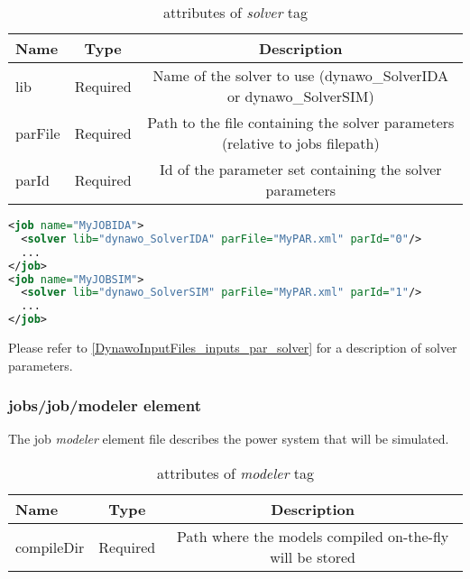 \documentclass[a4paper, 12pt]{report}
\begin{document}
\begin{table}[H]
\center
\begin{tabular}{ l | c | c }
\toprule
\textbf{{Name}} & \textbf{{Type}} & \textbf{{Description}}\\
\midrule
\rowcolor{white}
\small{lib} & \small{Required} & \small{Name of the solver to use (dynawo\_SolverIDA or dynawo\_SolverSIM)}\\
\rowcolor{gray!10}
\small{parFile} & \small{Required} & \small{Path to the file containing the solver parameters (relative to jobs filepath)}\\
\rowcolor{white}
\small{parId} & \small{Required} & \small{Id of the parameter set containing the solver parameters}\\
\bottomrule
\end{tabular}
\caption{attributes of \textit{solver} tag}
\end{table}

\begin{lstlisting}[language=XML, morekeywords={lib}]
<job name="MyJOBIDA">
  <solver lib="dynawo_SolverIDA" parFile="MyPAR.xml" parId="0"/>
  ...
</job>
<job name="MyJOBSIM">
  <solver lib="dynawo_SolverSIM" parFile="MyPAR.xml" parId="1"/>
  ...
</job>
\end{lstlisting}

Please refer to \ref{DynawoInputFiles_inputs_par_solver} for a description of solver parameters.

\subsubsection{jobs/job/modeler element}
\label{DynawoInputFiles_inputs_jobs_job_modeler}

The job \textit{modeler} element file describes the power system that will be simulated.

\begin{table}[H]
\center
\begin{tabular}{ l | c | c }
\toprule
\textbf{{Name}} & \textbf{{Type}} & \textbf{{Description}}\\
\midrule
\rowcolor{white}
\small{compileDir} & \small{Required} & \small{Path where the models compiled on-the-fly will be stored}\\
\bottomrule
\end{tabular}
\caption{attributes of \textit{modeler} tag}
\end{table}
\end{document}
